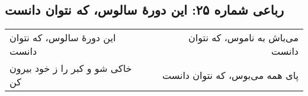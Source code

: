 \begin{center}
\section*{رباعی شماره ۲۵: این دورهٔ سالوس، که نتوان دانست}
\label{sec:025}
\begin{longtable}{l p{0.5cm} r}
این دورهٔ سالوس، که نتوان دانست
&&
می‌باش به ناموس، که نتوان دانست
\\
خاکی شو و کبر را ز خود بیرون کن
&&
پای همه می‌بوس، که نتوان دانست
\\
\end{longtable}
\end{center}
